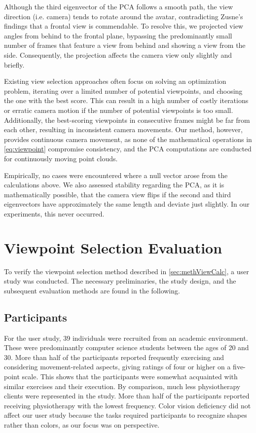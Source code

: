Although the third eigenvector of the PCA follows a smooth path, the view direction (i.e. camera) tends to rotate around the avatar, contradicting Zusne's~\cite{zusne1970vpf} findings that a frontal view is commendable. To resolve this, we projected view angles from behind to the frontal plane, bypassing the predominantly small number of frames that feature a view from behind and showing a view from the side. Consequently, the projection affects the camera view only slightly and briefly.

Existing view selection approaches often focus on solving an optimization problem, iterating over a limited number of potential viewpoints, and choosing the one with the best score. This can result in a high number of costly iterations or erratic camera motion if the number of potential viewpoints is too small. Additionally, the best-scoring viewpoints in consecutive frames might be far from each other, resulting in inconsistent camera movements. Our method, however, provides continuous camera movement, as none of the mathematical operations in \autoref{eq:viewpoint} compromise consistency, and the PCA computations are conducted for continuously moving point clouds.

Empirically, no cases were encountered where a null vector arose from the calculations above. We also assessed stability regarding the PCA, as it is mathematically possible, that the camera view flips if the second and third eigenvectors have approximately the same length and deviate just slightly. In our experiments, this never occurred.

\section{Viewpoint Selection Evaluation \label{sec:evaluation}}
To verify the viewpoint selection method described in \autoref{sec:methViewCalc}, a user study was conducted. The necessary preliminaries, the study design, and the subsequent evaluation methods are found in the following.

\subsection{Participants}
For the user study, 39 individuals were recruited from an academic environment. These were predominantly computer science students between the ages of 20 and 30. More than half of the participants reported frequently exercising and considering movement-related aspects, giving ratings of four or higher on a five-point scale. This shows that the participants were somewhat acquainted with similar exercises and their execution. By comparison, much less physiotherapy clients were represented in the study. More than half of the participants reported receiving physiotherapy with the lowest frequency. Color vision deficiency did not affect our user study because the tasks required participants to recognize shapes rather than colors, as our focus was on perspective.

